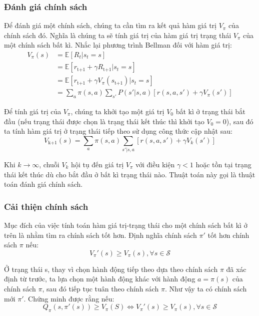 \documentclass{uetgraduation}
\begin{document}
\subsubsection{Đánh giá chính sách}
Để đánh giá một chính sách, chúng ta cần tìm ra kết quả hàm giá trị $V_\pi$ của chính sách đó. Nghĩa là chúng ta sẽ tính giá trị của hàm giá trị trạng thái $V_\pi$ của một chính sách bất kì.
Nhắc lại phương trình Bellman đối với hàm giá trị:
\begin{equation}
    \begin{split}
        V_\pi (s) &= \mathbb{E} [R_t | s_t = s] \\
        &= \mathbb{E} [r_\text{t+1} + \gamma R_\text{t+1} | s_t = s] \\
        &= \mathbb{E} [r_\text{t+1} + \gamma V_\pi (s_\text{t+1}) | s_t = s] \\
        &= \sum_{a} \pi(s, a) \sum_{s'} P(s' | s, a) [r(s, a, s') + \gamma V_\pi (s')]
    \end{split}
\end{equation}

Để tính giá trị của $V_\pi$, chúng ta khởi tạo một giá trị $V_0$ bất kì ở trạng thái bắt đầu (nếu trạng thái được chọn là trạng thái kết thúc thì khởi tạo $V_0 = 0$), sau đó ta tính hàm giá trị
ở trạng thái tiếp theo sử dụng công thức cập nhật sau:
\begin{equation}
    V_\text{k+1} (s) = \sum_{a} \pi (s, a) \sum_{s' | s, a} [r(s, a, s') + \gamma V_k (s')]
\end{equation}

Khi $k \to \infty$, chuỗi $V_k$ hội tụ đến giá trị $V_\pi$ với điều kiện $\gamma < 1$ hoặc tồn tại trạng thái kết thúc dù cho bắt đầu ở bất kì trạng thái nào. Thuật toán này gọi là thuật toán đánh giá
chính sách.

\subsubsection{Cải thiện chính sách}
Mục đích của việc tính toán hàm giá trị-trạng thái cho một chính sách bất kì ở trên là nhằm tìm ra chính sách tốt hơn. Định nghĩa chính sách $\pi'$ tốt hơn chính sách $\pi$ nếu:
\begin{equation}
    V_\pi' (s) \geq V_\pi (s), \forall s \in \mathcal{S}
\end{equation}

Ở trạng thái s, thay vì chọn hành động tiếp theo dựa theo chính sách $\pi$ đã xác định từ trước, ta lựa chọn một hành động khác với hành động $a = \pi(s)$ của chính sách $\pi$, sau
đó tiếp tục tuân theo chính sách $\pi$. Như vậy ta có chính sách mới $\pi'$. Chứng minh được rằng nếu:
\begin{equation}
    Q_\pi(s, \pi'(s)) \geq V_\pi (S) \iff V_\pi' (s) \geq V_\pi (s), \forall s \in \mathcal{S}
\end{equation}
\end{document}
